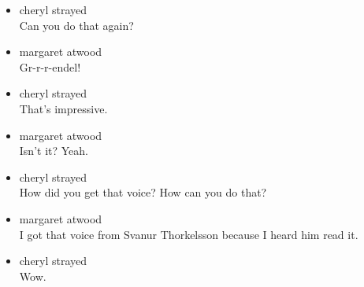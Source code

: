 \begin{itemize}
\item
  cheryl strayed\\
  Can you do that again?
\item
  margaret atwood\\
  Gr-r-r-endel!
\item
  cheryl strayed\\
  That's impressive.
\item
  margaret atwood\\
  Isn't it? Yeah.
\item
  cheryl strayed\\
  How did you get that voice? How can you do that?
\item
  margaret atwood\\
  I got that voice from Svanur Thorkelsson because I heard him read it.
\item
  cheryl strayed\\
  Wow.


\end{itemize}
